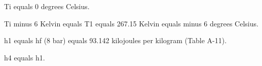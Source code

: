 Ti equals 0 degrees Celsius.

Ti minus 6 Kelvin equals T1 equals 267.15 Kelvin equals minus 6 degrees Celsius.

h1 equals hf (8 bar) equals 93.142 kilojoules per kilogram (Table A-11).

h4 equals h1.